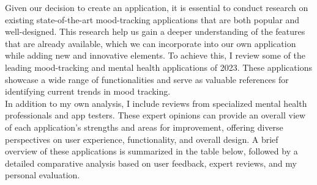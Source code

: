Given our decision to create an application, it is essential to conduct research on existing state-of-the-art mood-tracking applications that are both popular and well-designed. This research help us gain a deeper understanding of the features that are already available, which we can incorporate into our own application while adding new and innovative elements. To achieve this, I review some of the leading mood-tracking and mental health applications of 2023. These applications showcase a wide range of functionalities and serve as valuable references for identifying current trends in mood tracking.\vspace{5mm} \\
In addition to my own analysis, I include reviews from specialized mental health professionals and app testers. These expert opinions can provide an overall view of each application’s strengths and areas for improvement, offering diverse perspectives on user experience, functionality, and overall design. A brief overview of these applications is summarized in the table below, followed by a detailed comparative analysis based on user feedback, expert reviews, and my personal evaluation.

